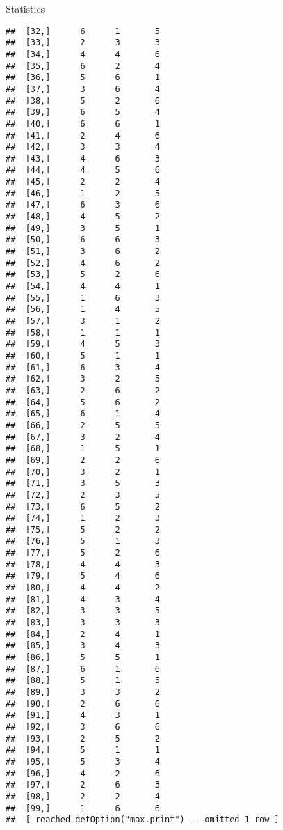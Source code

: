\documentclass[
  ignorenonframetext,
]{beamer}
\begin{document}
\begin{frame}[fragile]{Statistics}
\begin{verbatim}
##  [32,]      6      1       5
##  [33,]      2      3       3
##  [34,]      4      4       6
##  [35,]      6      2       4
##  [36,]      5      6       1
##  [37,]      3      6       4
##  [38,]      5      2       6
##  [39,]      6      5       4
##  [40,]      6      6       1
##  [41,]      2      4       6
##  [42,]      3      3       4
##  [43,]      4      6       3
##  [44,]      4      5       6
##  [45,]      2      2       4
##  [46,]      1      2       5
##  [47,]      6      3       6
##  [48,]      4      5       2
##  [49,]      3      5       1
##  [50,]      6      6       3
##  [51,]      3      6       2
##  [52,]      4      6       2
##  [53,]      5      2       6
##  [54,]      4      4       1
##  [55,]      1      6       3
##  [56,]      1      4       5
##  [57,]      3      1       2
##  [58,]      1      1       1
##  [59,]      4      5       3
##  [60,]      5      1       1
##  [61,]      6      3       4
##  [62,]      3      2       5
##  [63,]      2      6       2
##  [64,]      5      6       2
##  [65,]      6      1       4
##  [66,]      2      5       5
##  [67,]      3      2       4
##  [68,]      1      5       1
##  [69,]      2      2       6
##  [70,]      3      2       1
##  [71,]      3      5       3
##  [72,]      2      3       5
##  [73,]      6      5       2
##  [74,]      1      2       3
##  [75,]      5      2       2
##  [76,]      5      1       3
##  [77,]      5      2       6
##  [78,]      4      4       3
##  [79,]      5      4       6
##  [80,]      4      4       2
##  [81,]      4      3       4
##  [82,]      3      3       5
##  [83,]      3      3       3
##  [84,]      2      4       1
##  [85,]      3      4       3
##  [86,]      5      5       1
##  [87,]      6      1       6
##  [88,]      5      1       5
##  [89,]      3      3       2
##  [90,]      2      6       6
##  [91,]      4      3       1
##  [92,]      3      6       6
##  [93,]      2      5       2
##  [94,]      5      1       1
##  [95,]      5      3       4
##  [96,]      4      2       6
##  [97,]      2      6       3
##  [98,]      2      2       4
##  [99,]      1      6       6
##  [ reached getOption("max.print") -- omitted 1 row ]
\end{verbatim}
\end{frame}
\end{document}
